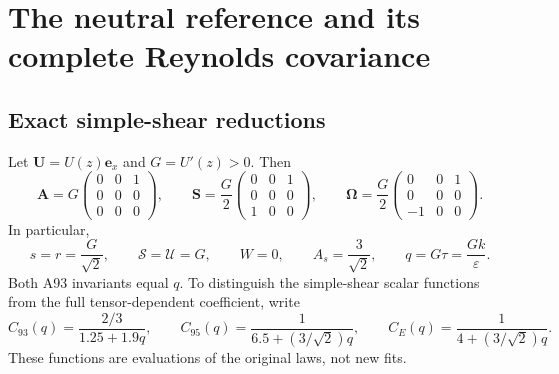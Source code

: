\documentclass[11pt,a4paper]{article}
\numberwithin{equation}{section}
\newcommand{\eps}{\varepsilon}
\newcommand{\Amat}{\boldsymbol A}
\newcommand{\Smat}{\boldsymbol S}
\newcommand{\Omat}{\boldsymbol\Omega}
\begin{document}
\section{The neutral reference and its complete Reynolds covariance}
\label{out:neutral}

\subsection{Exact simple-shear reductions}
\label{out:simpleshear}

Let $\boldsymbol U=U(z)\boldsymbol e_x$ and $G=U'(z)>0$. Then
\begin{equation}
 \Amat=G\begin{pmatrix}0&0&1\\0&0&0\\0&0&0\end{pmatrix},\qquad
 \Smat=\frac G2\begin{pmatrix}0&0&1\\0&0&0\\1&0&0\end{pmatrix},\qquad
 \Omat=\frac G2\begin{pmatrix}0&0&1\\0&0&0\\-1&0&0\end{pmatrix}.
 \label{out:shearmatrices}
\end{equation}
In particular,
\begin{equation}
 s=r=\frac G{\sqrt2},\qquad
 \mathcal S=\mathcal U=G,\qquad
 W=0,\qquad A_s=\frac3{\sqrt2},\qquad
 q=G\tau=\frac{Gk}{\eps}.
 \label{out:shearinvariants}
\end{equation}
Both A93 invariants equal $q$. To distinguish the simple-shear scalar
functions from the full tensor-dependent coefficient, write
\begin{equation}
 C_{93}(q)=\frac{2/3}{1.25+1.9q},\qquad
 C_{95}(q)=\frac1{6.5+(3/\sqrt2)q},\qquad
 C_E(q)=\frac1{4+(3/\sqrt2)q}.
 \label{out:Cq}
\end{equation}
These functions are evaluations of the original laws, not new fits.
\end{document}
